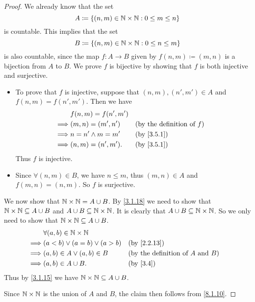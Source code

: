 \begin{proof}
	We already know that the set
	\[
		A \coloneqq \left\lbrace(n, m) \in \mathbb{N} \times \mathbb{N} : 0 \leq m \leq n\right\rbrace
	\]
	is countable.
	This implies that the set
	\[
		B \coloneqq \left\lbrace(n, m) \in \mathbb{N} \times \mathbb{N} : 0 \leq n \leq m\right\rbrace
	\]
	is also countable, since the map \(f : A \to B\) given by \(f(n, m) \coloneqq (m, n)\) is a bijection from \(A\) to \(B\).
	We prove \(f\) is bijective by showing that \(f\) is both injective and surjective.
	\begin{itemize}
		\item To prove that \(f\) is injective, suppose that \((n, m), (n', m') \in A\) and \(f(n, m) = f(n', m')\).
		      Then we have
		      \begin{align*}
			               & f(n, m) = f(n', m')                                          \\
			      \implies & (m, n) = (m', n')   &  & \text{(by the definition of \(f\))} \\
			      \implies & n = n' \land m = m' &  & \by{3.5.1}                          \\
			      \implies & (n, m) = (n', m').  &  & \by{3.5.1}
		      \end{align*}
		      Thus \(f\) is injective.
		\item Since \(\forall (n, m) \in B\), we have \(n \leq m\), thus \((m, n) \in A\) and \(f(m, n) = (n, m)\).
		      So \(f\) is surjective.
	\end{itemize}

	We now show that \(\mathbb{N} \times \mathbb{N} = A \cup B\).
	By \cref{3.1.18} we need to show that \(\mathbb{N} \times \mathbb{N} \subseteq A \cup B\) and \(A \cup B \subseteq \mathbb{N} \times \mathbb{N}\).
	It is clearly that \(A \cup B \subseteq \mathbb{N} \times \mathbb{N}\).
	So we only need to show that \(\mathbb{N} \times \mathbb{N} \subseteq A \cup B\).
	\begin{align*}
		         & \forall (a, b) \in \N \times \N                                                      \\
		\implies & (a < b) \lor (a = b) \lor (a > b) &  & \by{2.2.13}                                   \\
		\implies & (a, b) \in A \lor (a, b) \in B    &  & \text{(by the definition of \(A\) and \(B\))} \\
		\implies & (a, b) \in A \cup B.              &  & \by{3.4}
	\end{align*}
	Thus by \cref{3.1.15} we have \(\mathbb{N} \times \mathbb{N} \subseteq A \cup B\).

	Since \(\mathbb{N} \times \mathbb{N}\) is the union of \(A\) and \(B\), the claim then follows from \cref{8.1.10}.
\end{proof}

